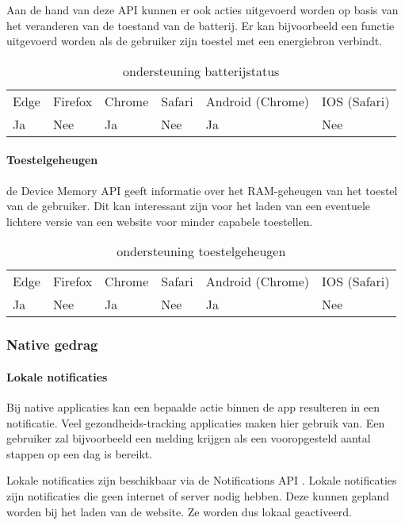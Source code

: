 Aan de hand van deze API kunnen er ook acties uitgevoerd worden op basis van het veranderen van de toestand van de batterij. Er kan bijvoorbeeld een functie uitgevoerd worden als de gebruiker zijn toestel met een energiebron verbindt.

\begin{table}[]
	\begin{tabular}{llllll}
		Edge & Firefox & Chrome & Safari & Android (Chrome) & IOS (Safari) \\
		Ja   & Nee      &  Ja     & Nee     & Ja               & Nee          
	\end{tabular}	
	\caption{ondersteuning batterijstatus  }
	\label{ondersteuning batterijstatus }
\end{table}

\paragraph{Toestelgeheugen}
de Device Memory API \autocite{Panicker2020} geeft informatie over het RAM-geheugen van het toestel van de gebruiker. Dit kan interessant zijn voor het laden van een eventuele lichtere versie van een website voor minder capabele toestellen.

\begin{table}[]
	\begin{tabular}{llllll}
		Edge & Firefox & Chrome & Safari & Android (Chrome) & IOS (Safari) \\
		Ja   & Nee      &  Ja     & Nee     & Ja               & Nee          
	\end{tabular}	
	\caption{ondersteuning toestelgeheugen }
	\label{ondersteuning toestelgeheugen }
\end{table}



\subsubsection{Native gedrag}

\paragraph{Lokale notificaties}
Bij native applicaties kan een bepaalde actie binnen de app resulteren in een notificatie. Veel gezondheids-tracking applicaties maken hier gebruik van. Een gebruiker zal bijvoorbeeld een melding krijgen als een vooropgesteld aantal stappen op een dag is bereikt.

Lokale notificaties zijn beschikbaar via de Notifications API \autocite{Gregg2020}. Lokale notificaties zijn notificaties die geen internet of server nodig hebben. Deze kunnen gepland worden bij het laden van de website. Ze worden dus lokaal geactiveerd.

